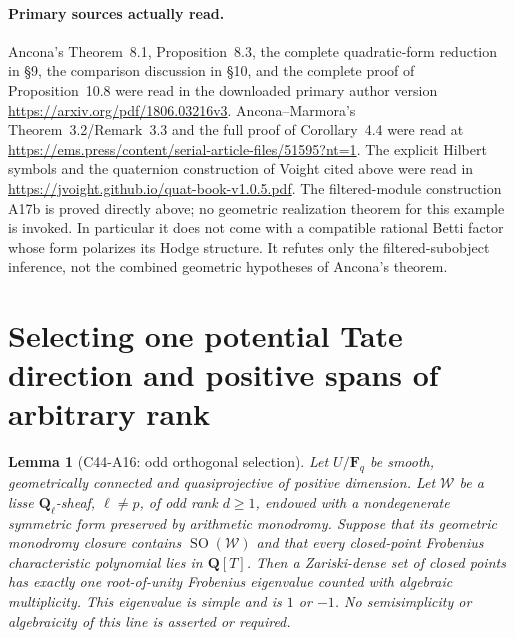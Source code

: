 \documentclass[11pt]{article}
\newtheorem{lemma}[theorem]{Lemma}
\theoremstyle{remark}\newtheorem{remark}[theorem]{Remark}
\begin{document}
\paragraph{Primary sources actually read.}
Ancona's Theorem~8.1, Proposition~8.3, the complete
quadratic-form reduction in \S9, the comparison
discussion in \S10, and the complete proof of
Proposition~10.8 were read in the downloaded primary
author version
\url{https://arxiv.org/pdf/1806.03216v3}.
Ancona--Marmora's Theorem~3.2/Remark~3.3 and the full
proof of Corollary~4.4 were read at
\url{https://ems.press/content/serial-article-files/51595?nt=1}.
The explicit Hilbert symbols and the quaternion
construction of Voight cited above were read in
\url{https://jvoight.github.io/quat-book-v1.0.5.pdf}.
The filtered-module construction A17b is proved
directly above; no geometric realization theorem
for this example is invoked. In particular it does not
come with a compatible rational Betti factor whose form
polarizes its Hodge structure. It refutes only the
filtered-subobject inference, not the combined geometric
hypotheses of Ancona's theorem.


\section{Selecting one potential Tate direction and positive spans of arbitrary rank}
\label{sec:c44-a16}

\begin{lemma}[C44-A16: odd orthogonal selection]
Let $U/\mathbf F_q$ be smooth, geometrically connected and
quasiprojective of positive dimension. Let $\mathcal W$ be
a lisse $\mathbf Q_\ell$-sheaf, $\ell\ne p$, of odd rank
$d\geq1$, endowed with a nondegenerate symmetric form
preserved by arithmetic monodromy. Suppose that its geometric
monodromy closure contains $\operatorname{SO}(\mathcal W)$
and that every closed-point Frobenius characteristic
polynomial lies in $\mathbf Q[T]$.
Then a Zariski-dense set of closed points has exactly one
root-of-unity Frobenius eigenvalue counted with algebraic
multiplicity. This eigenvalue is simple and is $1$ or $-1$.
No semisimplicity or algebraicity of this line is asserted
or required.
\end{lemma}
\end{document}
